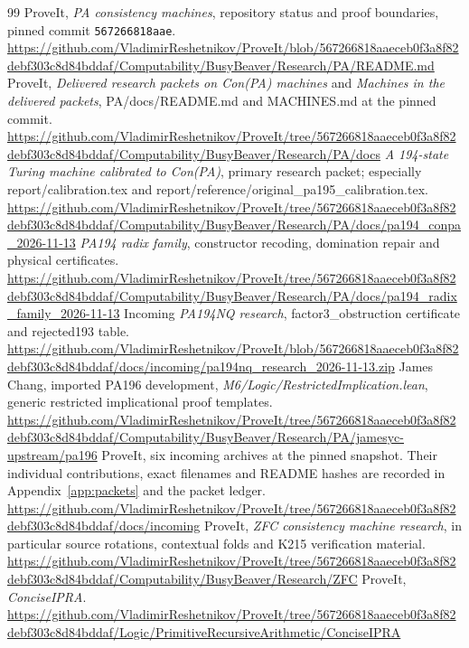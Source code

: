\documentclass[11pt,letterpaper]{article}
\newcommand{\snapshot}{\texttt{567266818aae}}
\begin{document}
\begin{thebibliography}{99}
 ProveIt, \emph{PA consistency machines}, repository status and proof boundaries, pinned commit \snapshot.\\
\url{https://github.com/VladimirReshetnikov/ProveIt/blob/567266818aaeceb0f3a8f82debf303c8d84bddaf/Computability/BusyBeaver/Research/PA/README.md}
 ProveIt, \emph{Delivered research packets on Con(PA) machines} and \emph{Machines in the delivered packets}, PA/docs/README.md and MACHINES.md at the pinned commit.\\
\url{https://github.com/VladimirReshetnikov/ProveIt/tree/567266818aaeceb0f3a8f82debf303c8d84bddaf/Computability/BusyBeaver/Research/PA/docs}
 \emph{A 194-state Turing machine calibrated to Con(PA)}, primary research packet; especially report/calibration.tex and report/reference/original\_pa195\_calibration.tex.\\
\url{https://github.com/VladimirReshetnikov/ProveIt/tree/567266818aaeceb0f3a8f82debf303c8d84bddaf/Computability/BusyBeaver/Research/PA/docs/pa194_conpa_2026-11-13}
 \emph{PA194 radix family}, constructor recoding, domination repair and physical certificates.\\
\url{https://github.com/VladimirReshetnikov/ProveIt/tree/567266818aaeceb0f3a8f82debf303c8d84bddaf/Computability/BusyBeaver/Research/PA/docs/pa194_radix_family_2026-11-13}
 Incoming \emph{PA194NQ research}, factor3\_obstruction certificate and rejected193 table.\\
\url{https://github.com/VladimirReshetnikov/ProveIt/blob/567266818aaeceb0f3a8f82debf303c8d84bddaf/docs/incoming/pa194nq_research_2026-11-13.zip}
 James Chang, imported PA196 development, \emph{M6/Logic/RestrictedImplication.lean}, generic restricted implicational proof templates.\\
\url{https://github.com/VladimirReshetnikov/ProveIt/tree/567266818aaeceb0f3a8f82debf303c8d84bddaf/Computability/BusyBeaver/Research/PA/jamesyc-upstream/pa196}
 ProveIt, six incoming archives at the pinned snapshot. Their individual contributions, exact filenames and README hashes are recorded in Appendix~\ref{app:packets} and the packet ledger.\\
\url{https://github.com/VladimirReshetnikov/ProveIt/tree/567266818aaeceb0f3a8f82debf303c8d84bddaf/docs/incoming}
 ProveIt, \emph{ZFC consistency machine research}, in particular source rotations, contextual folds and K215 verification material.\\
\url{https://github.com/VladimirReshetnikov/ProveIt/tree/567266818aaeceb0f3a8f82debf303c8d84bddaf/Computability/BusyBeaver/Research/ZFC}
 ProveIt, \emph{ConciseIPRA}.\\
\url{https://github.com/VladimirReshetnikov/ProveIt/tree/567266818aaeceb0f3a8f82debf303c8d84bddaf/Logic/PrimitiveRecursiveArithmetic/ConciseIPRA}
\end{thebibliography}
\end{document}
